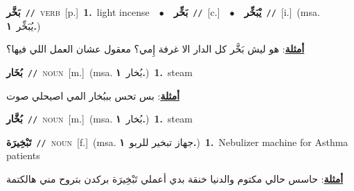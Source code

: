 \documentclass[10pt,a4paper,twoside]{article} %
\begin{document}
\begin{multicols}{2}
{\setlength\topsep{0pt}\textbf{\foreignlanguage{arabic}{بَخَّر}}\ {\color{gray}\texttt{//}\color{black}}\ \textsc{verb}\ [p.]\ \textbf{1.}~light incense\ \ $\bullet$\ \ \setlength\topsep{0pt}\textbf{\foreignlanguage{arabic}{بَخِّر}}\ {\color{gray}\texttt{//}\color{black}}\ [c.]\ \ $\bullet$\ \ \setlength\topsep{0pt}\textbf{\foreignlanguage{arabic}{يْبَخِّر}}\ {\color{gray}\texttt{//}\color{black}}\ [i.]\ \color{gray}(msa. \foreignlanguage{arabic}{يُبَخِّر}~\foreignlanguage{arabic}{\textbf{١.}})\color{black}\  \begin{flushright}\color{gray}\foreignlanguage{arabic}{\textbf{\underline{\foreignlanguage{arabic}{أمثلة}}}: هو ليش بَخَّر كل الدار الا غرفة إِمي؟ معقول عشان العمل اللي فيها؟}\end{flushright}\color{black}} \vspace{2mm}

{\setlength\topsep{0pt}\textbf{\foreignlanguage{arabic}{بُخَار}}\ {\color{gray}\texttt{//}\color{black}}\ \textsc{noun}\ [m.]\ \color{gray}(msa. \foreignlanguage{arabic}{بُخار}~\foreignlanguage{arabic}{\textbf{١.}})\color{black}\ \textbf{1.}~steam\  \begin{flushright}\color{gray}\foreignlanguage{arabic}{\textbf{\underline{\foreignlanguage{arabic}{أمثلة}}}: بس تحس بببُخار المي اصيحلي صوت}\end{flushright}\color{black}} \vspace{2mm}

{\setlength\topsep{0pt}\textbf{\foreignlanguage{arabic}{بُخَّار}}\ {\color{gray}\texttt{//}\color{black}}\ \textsc{noun}\ [m.]\ \color{gray}(msa. \foreignlanguage{arabic}{بُخار}~\foreignlanguage{arabic}{\textbf{١.}})\color{black}\ \textbf{1.}~steam\ } \vspace{2mm}

{\setlength\topsep{0pt}\textbf{\foreignlanguage{arabic}{تَبْخِيرَة}}\ {\color{gray}\texttt{//}\color{black}}\ \textsc{noun}\ [f.]\ \color{gray}(msa. \foreignlanguage{arabic}{جهاز تبخير للربو}~\foreignlanguage{arabic}{\textbf{١.}})\color{black}\ \textbf{1.}~Nebulizer machine for Asthma patients\  \begin{flushright}\color{gray}\foreignlanguage{arabic}{\textbf{\underline{\foreignlanguage{arabic}{أمثلة}}}: حاسس حالي مكتوم والدنيا خنقة بدي أعملي تَبْخِيرَة بركدن بتروح مني هالكتمة}\end{flushright}\color{black}} \vspace{2mm}


\end{multicols}
\end{document}
